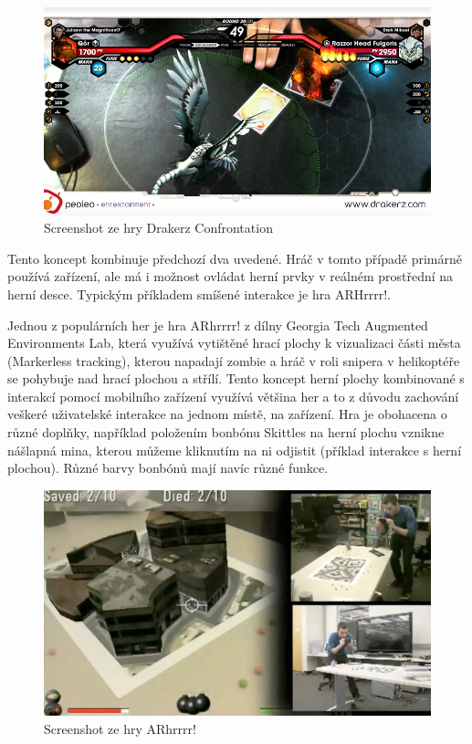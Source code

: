 \documentclass[twoside,12pt]{article}
\begin{document}
\begin{figure}[H]
    \includegraphics[width=424px, center]{images/drakerz-confrontation.jpg}
    \caption{Screenshot ze hry Drakerz Confrontation}
    \label{drakerz_screenshot}
\end{figure}

Tento koncept kombinuje předchozí dva uvedené. Hráč v tomto případě primárně používá zařízení, ale má i možnost ovládat herní prvky v reálném prostřední na herní desce. Typickým příkladem smíšené interakce je hra ARHrrrr!.

% 
Jednou z populárních her je hra ARhrrrr! z dílny Georgia Tech Augmented Environments Lab, která využívá vytištěné hrací plochy k vizualizaci části města (Markerless tracking), kterou napadají zombie a hráč v roli snipera v helikoptéře se pohybuje nad hrací plochou a střílí. Tento koncept herní plochy kombinované s interakcí pomocí mobilního zařízení využívá většina her a to z důvodu zachování veškeré uživatelské interakce na jednom místě, na zařízení. Hra je obohacena o různé doplňky, například položením bonbónu Skittles na herní plochu vznikne nášlapná mina, kterou můžeme kliknutím na ni odjistit (příklad interakce s herní plochou). Různé barvy bonbónů mají navíc různé funkce.

\begin{figure}[H]
    \includegraphics[width=424px, center]{images/arhrrrr.jpg}
    \caption{Screenshot ze hry ARhrrrr!}
    \label{arhrrrr_screenshot}
\end{figure}
\end{document}
